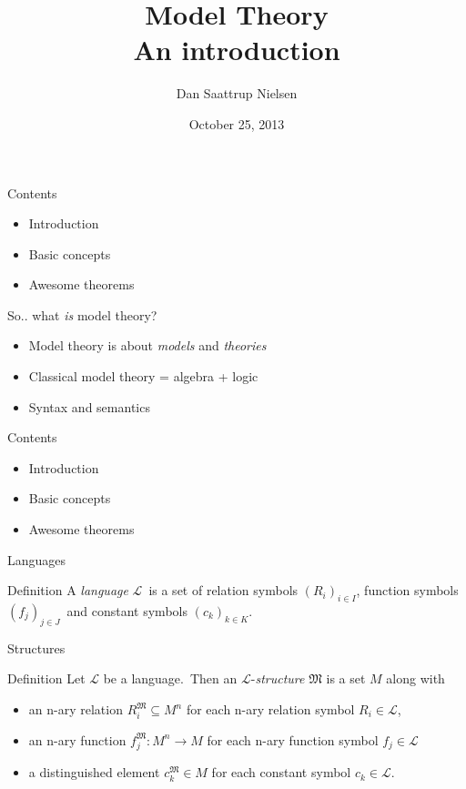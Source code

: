 \documentclass{beamer}
\title[Model Theory]{Model Theory \\ An introduction}
\author{Dan Saattrup Nielsen}
\date{October 25, 2013}
\begin{document}
\begin{frame}
	\titlepage
\end{frame}

\begin{frame}{Contents}
	\begin{itemize}
		\item<1-4> Introduction
		\item<2-3> Basic concepts
		\item<3> Awesome theorems
	\end{itemize}
\end{frame}


\begin{frame}{So.. what \textit{is} model theory?}
\begin{itemize}
\pause\item Model theory is about \textit{models} and \textit{theories}
\pause\item Classical model theory = algebra + logic
\pause\item Syntax and semantics
\end{itemize}
\end{frame}


\begin{frame}{Contents}
	\begin{itemize}
		\item<0> Introduction
		\item<1> Basic concepts
		\item<0> Awesome theorems
	\end{itemize}
\end{frame}


\begin{frame}{Languages}
\begin{block}{Definition}
A \textit{language} $\mathcal{L}$\pause\ is a set of relation symbols $(R_i)_{i\in I}$\pause, function symbols $(f_j)_{j\in J}$\pause\ and constant symbols $(c_k)_{k\in K}$.
\end{block}
\end{frame}


\begin{frame}{Structures}
\begin{block}{Definition}
	Let $\mathcal{L}$ be a language.\pause\ Then an $\mathcal{L}$-\textit{structure} $\mathfrak{M}$ is a set $M$ along with
\begin{itemize}
	\pause\item an n-ary relation $R_i^\mathfrak{M}\subseteq M^n$ for each n-ary relation symbol $R_i\in\mathcal{L}$,
	\pause\item an n-ary function $f_j^\mathfrak{M}:M^n\to M$ for each n-ary function symbol $f_j\in\mathcal{L}$
	\pause\item a distinguished element $c_k^\mathfrak{M}\in M$ for each constant symbol $c_k\in\mathcal{L}$.
\end{itemize}				
\end{block}
\end{frame}
\end{document}

